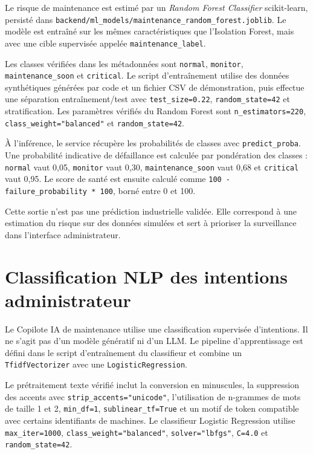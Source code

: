 Le risque de maintenance est estimé par un \textit{Random Forest Classifier} scikit-learn, persisté dans \texttt{backend/ml\_models/maintenance\_random\_forest.joblib}. Le modèle est entraîné sur les mêmes caractéristiques que l'Isolation Forest, mais avec une cible supervisée appelée \texttt{maintenance\_label}.

Les classes vérifiées dans les métadonnées sont \texttt{normal}, \texttt{monitor}, \texttt{maintenance\_soon} et \texttt{critical}. Le script d'entraînement utilise des données synthétiques générées par code et un fichier CSV de démonstration, puis effectue une séparation entraînement/test avec \texttt{test\_size=0.22}, \texttt{random\_state=42} et stratification. Les paramètres vérifiés du Random Forest sont \texttt{n\_estimators=220}, \texttt{class\_weight="balanced"} et \texttt{random\_state=42}.

À l'inférence, le service récupère les probabilités de classes avec \texttt{predict\_proba}. Une probabilité indicative de défaillance est calculée par pondération des classes : \texttt{normal} vaut 0,05, \texttt{monitor} vaut 0,30, \texttt{maintenance\_soon} vaut 0,68 et \texttt{critical} vaut 0,95. Le score de santé est ensuite calculé comme \texttt{100 - failure\_probability * 100}, borné entre 0 et 100.

Cette sortie n'est pas une prédiction industrielle validée. Elle correspond à une estimation du risque sur des données simulées et sert à prioriser la surveillance dans l'interface administrateur.

\section{Classification NLP des intentions administrateur}

Le Copilote IA de maintenance utilise une classification supervisée d'intentions. Il ne s'agit pas d'un modèle génératif ni d'un LLM. Le pipeline d'apprentissage est défini dans le script d'entraînement du classifieur et combine un \texttt{TfidfVectorizer} avec une \texttt{LogisticRegression}.

Le prétraitement texte vérifié inclut la conversion en minuscules, la suppression des accents avec \texttt{strip\_accents="unicode"}, l'utilisation de n-grammes de mots de taille 1 et 2, \texttt{min\_df=1}, \texttt{sublinear\_tf=True} et un motif de token compatible avec certains identifiants de machines. Le classifieur Logistic Regression utilise \texttt{max\_iter=1000}, \texttt{class\_weight="balanced"}, \texttt{solver="lbfgs"}, \texttt{C=4.0} et \texttt{random\_state=42}.

